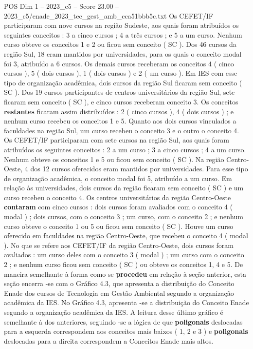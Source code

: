 \begin{textsample}{POS Dim 1 – 2023\_c5 – Score 23.00 – 2023\_c5/enade\_2023\_tec\_gest\_amb\_cca51bbb5c.txt}
Os CEFET/IF participaram com nove cursos na região Sudeste, aos quais foram atribuídos os seguintes conceitos : 3 a cinco cursos ; 4 a três cursos ; e 5 a um curso.
Nenhum curso obteve os conceitos 1 e 2 ou ficou sem conceito ( SC ).
Dos 46 cursos da região Sul, 18 eram mantidos por universidades, para os quais o conceito modal foi 3, atribuído a 6 cursos.
Os demais cursos receberam os conceitos 4 ( cinco cursos ), 5 ( dois cursos ), 1 ( dois cursos ) e 2 ( um curso ).
Em IES com esse tipo de organização acadêmica, dois cursos da região Sul ficaram sem conceito ( SC ).
Dos 19 cursos participantes de centros universitários da região Sul, sete ficaram sem conceito ( SC ), e cinco cursos receberam conceito 3.
Os conceitos \textbf{restantes} ficaram assim distribuídos : 2 ( cinco cursos ), 4 ( dois cursos ) ; e nenhum curso recebeu os conceitos 1 e 5.
Quanto aos dois cursos vinculados a faculdades na região Sul, um curso recebeu o conceito 3 e o outro o conceito 4.
Os CEFET/IF participaram com sete cursos na região Sul, aos quais foram atribuídos os seguintes conceitos : 2 a um curso ; 3 a cinco cursos ; 4 a um curso.
Nenhum obteve os conceitos 1 e 5 ou ficou sem conceito ( SC ).
Na região Centro-Oeste, 4 dos 12 cursos oferecidos eram mantidos por universidades.
Para esse tipo de organização acadêmica, o conceito modal foi 5, atribuído a um curso.
Em relação às universidades, dois cursos da região ficaram sem conceito ( SC ) e um curso recebeu o conceito 4.
Os centros universitários da região Centro-Oeste \textbf{contaram} com cinco cursos : dois cursos foram avaliados com o conceito 4 ( modal ) ; dois cursos, com o conceito 3 ; um curso, com o conceito 2 ; e nenhum curso obteve o conceito 1 ou 5 ou ficou sem conceito ( SC ).
Houve um curso oferecido em faculdades na região Centro-Oeste, que recebeu o conceito 4 ( modal ).
No que se refere aos CEFET/IF da região Centro-Oeste, dois cursos foram avaliados : um curso deles com o conceito 3 ( modal ) ; um curso com o conceito 2 ; e nenhum curso ficou sem conceito ( SC ) ou obteve os conceitos 1, 4 e 5.
De maneira semelhante à forma como se \textbf{procedeu} em relação à seção anterior, esta seção encerra -se com o Gráfico 4.3, que apresenta a distribuição do Conceito Enade dos cursos de Tecnologia em Gestão Ambiental segundo a organização acadêmica da IES.
No Gráfico 4.3, apresenta -se a distribuição do Conceito Enade segundo a organização acadêmica da IES.
A leitura desse último gráfico é semelhante à dos anteriores, seguindo -se a lógica de que \textbf{poligonais} deslocadas para a esquerda correspondem aos conceitos mais baixos ( 1, 2 e 3 ) e \textbf{poligonais} deslocadas para a direita correspondem a Conceitos Enade mais altos.

\end{textsample}
